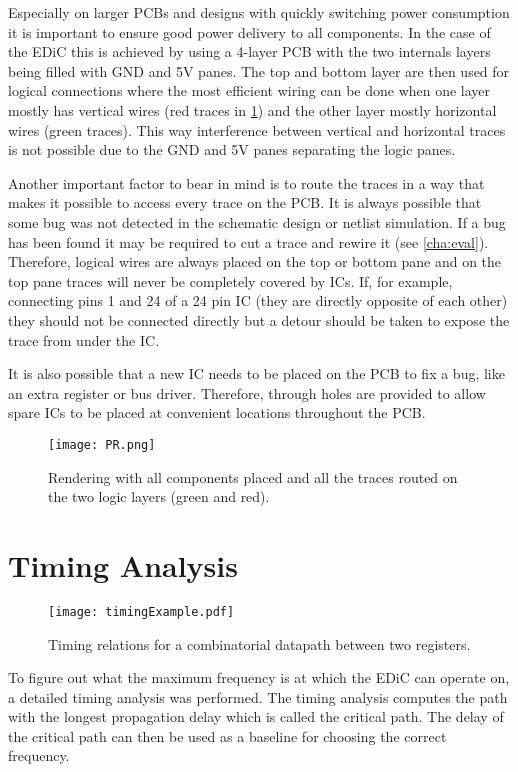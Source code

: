Especially on larger \glspl{PCB} and designs with quickly switching power consumption it is important to ensure good power delivery to all components.
In the case of the \gls{EDiC} this is achieved by using a 4-layer \gls{PCB} with the two internals layers being filled with GND and 5V panes.
The top and bottom layer are then used for logical connections where the most efficient wiring can be done when one layer mostly has vertical wires (red traces in \cref{fig:pr}) and the other layer mostly horizontal wires (green traces).
This way interference between vertical and horizontal traces is not possible due to the GND and 5V panes separating the logic panes.

Another important factor to bear in mind is to route the traces in a way that makes it possible to access every trace on the \gls{PCB}.
It is always possible that some bug was not detected in the schematic design or netlist simulation.
If a bug has been found it may be required to cut a trace and rewire it (see \cref{cha:eval}).
Therefore, logical wires are always placed on the top or bottom pane and on the top pane traces will never be completely covered by \glspl{IC}.
If, for example, connecting pins 1 and 24 of a 24 pin \gls{IC} (they are directly opposite of each other) they should not be connected directly but a detour should be taken to expose the trace from under the \gls{IC}.

It is also possible that a new \gls{IC} needs to be placed on the \gls{PCB} to fix a bug, like an extra register or bus driver.
Therefore, through holes are provided to allow spare \glspl{IC} to be placed at convenient locations throughout the \gls{PCB}.

\begin{figure}[p]
  \centering
  \texttt{[image: PR.png]}
  \caption{Rendering with all components placed and all the traces routed on the two logic layers (green and red).}
  \label{fig:pr}
\end{figure}
\section{Timing Analysis}\label{sec:timing}
\begin{figure}[t]
  \centering
  \texttt{[image: timingExample.pdf]}
  \caption{Timing relations for a combinatorial datapath between two registers.}
  \label{fig:timingExample}
\end{figure}
To figure out what the maximum frequency is at which the \gls{EDiC} can operate on, a detailed timing analysis was performed.
The timing analysis computes the path with the longest propagation delay which is called the critical path.
The delay of the critical path can then be used as a baseline for choosing the correct frequency.

